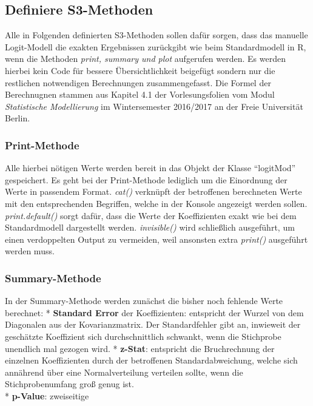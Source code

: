 \documentclass[12pt,]{article}
\begin{document}
\subsection{Definiere S3-Methoden}\label{definiere-s3-methoden}

Alle in Folgenden definierten S3-Methoden sollen dafür sorgen, dass das
manuelle Logit-Modell die exakten Ergebnissen zurückgibt wie beim
Standardmodell in R, wenn die Methoden \emph{print, summary und plot}
aufgerufen werden. Es werden hierbei kein Code für bessere
Übersichtlichkeit beigefügt sondern nur die restlichen notwendigen
Berechnungen zusammengefasst. Die Formel der Berechnugnen stammen aus
Kapitel 4.1 der Vorlesungsfolien vom Modul \emph{Statistische
Modellierung} im Wintersemester 2016/2017 an der Freie Universität
Berlin.

\subsubsection{Print-Methode}\label{print-methode}

Alle hierbei nötigen Werte werden bereit in das Objekt der Klasse
``logitMod'' gespeichert. Es geht bei der Print-Methode lediglich um die
Einordnung der Werte in passendem Format. \emph{cat()} verknüpft der
betroffenen berechneten Werte mit den entsprechenden Begriffen, welche
in der Konsole angezeigt werden sollen. \emph{print.default()} sorgt
dafür, dass die Werte der Koeffizienten exakt wie bei dem Standardmodell
dargestellt werden. \emph{invisible()} wird schließlich ausgeführt, um
einen verdoppelten Output zu vermeiden, weil ansonsten extra
\emph{print()} ausgeführt werden muss.

\subsubsection{Summary-Methode}\label{summary-methode}

In der Summary-Methode werden zunächst die bisher noch fehlende Werte
berechnet: * \textbf{Standard Error} der Koeffizienten: entspricht der
Wurzel von dem Diagonalen aus der Kovarianzmatrix. Der Standardfehler
gibt an, inwieweit der geschätzte Koeffizient sich durchschnittlich
schwankt, wenn die Stichprobe unendlich mal gezogen wird. *
\textbf{z-Stat}: entspricht die Bruchrechnung der einzelnen
Koeffizienten durch der betroffenen Standardabweichung, welche sich
annährend über eine Normalverteilung verteilen sollte, wenn die
Stichprobenumfang groß genug ist.\\
* \textbf{p-Value}: zweiseitige
\end{document}
